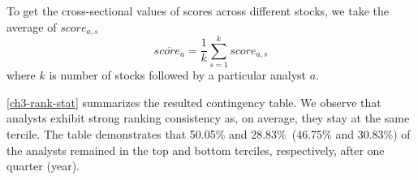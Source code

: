 \documentclass[a4paper,twoside,12pt,openright,notitlepage]{report}\usepackage[]{graphicx}\usepackage[]{color}
\begin{document}
To get the cross-sectional values of scores across different stocks, we take the average of $score_{a,s}$
\begin{equation}
\label{ch3-eq:mean-score}
\overline{score_{a}}= \frac{1}{k} \sum_{s=1}^{k} score_{a,s}
\end{equation}
where $k$ is number of stocks followed by a particular analyst $a$.

\ref{ch3-rank-stat} summarizes the resulted contingency table. We observe that analysts exhibit strong ranking consistency as, on average, they stay at the same tercile. The table demonstrates that 50.05\% and  28.83\%~(46.75\% and 30.83\%) of the analysts  remained in the top and bottom terciles, respectively, after one quarter (year).

\end{document}
